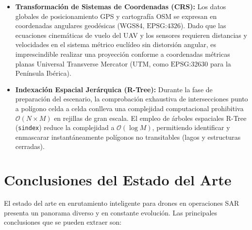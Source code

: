 \begin{itemize}
	\item \textbf{Transformación de Sistemas de Coordenadas (CRS):} 
	Los datos globales de posicionamiento GPS y cartografía OSM se expresan en coordenadas angulares geodésicas (WGS84, $\text{EPSG:4326}$). Dado que las ecuaciones cinemáticas de vuelo del UAV y los sensores requieren distancias y velocidades en el sistema métrico euclídeo sin distorsión angular, es imprescindible realizar una proyección conforme a coordenadas métricas planas Universal Transverse Mercator (UTM, como $\text{EPSG:32630}$ para la Península Ibérica).
	
	\item \textbf{Indexación Espacial Jerárquica (R-Tree):} 
	Durante la fase de preparación del escenario, la comprobación exhaustiva de intersecciones punto a polígono celda a celda conlleva una complejidad computacional prohibitiva $\mathcal{O}(N \times M)$ en rejillas de gran escala. El empleo de árboles espaciales R-Tree (\texttt{sindex}) reduce la complejidad a $\mathcal{O}(\log M)$, permitiendo identificar y enmascarar instantáneamente polígonos no transitables (lagos y estructuras cerradas).
\end{itemize}

\section{Conclusiones del Estado del Arte}

El estado del arte en enrutamiento inteligente para drones en operaciones SAR presenta un panorama diverso y en constante evolución. Las principales conclusiones que se pueden extraer son:

